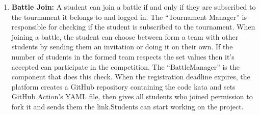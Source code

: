 \begin{enumerate}
   \newpage
   
   \item \textbf{Battle Join:}
   A student can join a battle if and only if they are subscribed to the tournament it belongs to and logged in. The “Tournament Manager” is responsible for checking if the student is subscribed to the tournament. When joining a battle, the student can choose between form a team with other students by sending them an invitation or doing it on their own. If the number of students in the formed team respects the set values then it’s accepted can participate in the competition. The “BattleManager” is the component that does this check. When the registration deadline expires, the platform creates a GitHub repository containing the code kata and sets GitHub Action's YAML file, then gives all students who joined permission to fork it and sends them the link.Students can start working on the project.
   

\end{enumerate}
